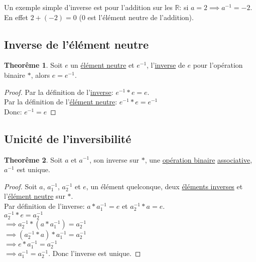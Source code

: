 \documentclass[12pt]{book}
\let\Bbb\mathbb
\def\sep{\phantom{}}
\theoremstyle{definition}
\newtheorem{theorem}{Theorême}[section]
\begin{document}
Un exemple simple d'inverse est pour l'addition sur les $\Bbb R$: si $a = 2 \implies a^{-1} = -2$. En effet $2 + (-2) = 0$ (0 est l'élément neutre de l'addition).

\subsection{Inverse de l'élément neutre}
\begin{theorem}
    \label{thm:inverse_neutre} Soit $e$ un \hyperref[def:neutre]{élément neutre} et $e^{-1}$, l'\hyperref[def:inverse]{inverse} de $e$ pour l'opération binaire $\ast$,
    alors $e = e^{-1}$.
\end{theorem}
\begin{proof}
    Par la définition de l'\hyperref[def:inverse]{inverse}: $ e^{-1} \ast e = e $. \\ \sep 
    Par la définition de l'\hyperref[def:neutre]{élément neutre}: $ e^{-1} \ast e = e^{-1} $ \\ \sep
    Donc: $e^{-1} = e$
\end{proof}

\subsection{Unicité de l'inversibilité}
\begin{theorem}
    \label{thm:inverse_unique} Soit $a$ et $a^{-1}$, son inverse sur $\ast$, une \hyperref[def:operation_binaire]{opération binaire} \hyperref[def:associativite]{associative}, $a^{-1}$ est unique.
\end{theorem}
\begin{proof}
    Soit $a$, $a_1^{-1}$, $a_2^{-1}$ et $e$, un élément quelconque, deux \hyperref[def:inverse]{éléments inverses} et l'\hyperref[def:neutre]{élément neutre} sur $\ast$. \sep \\
    Par définition de l'inverse: $a \ast a_1^{-1} = e$ et $a_2^{-1} \ast a = e$. \sep \\
    $a_2^{-1} \ast e = a_2^{-1}$ \sep \\
    $\implies a_2^{-1} \ast (a \ast a_1^{-1}) = a_2^{-1}$ \sep \\
    $\implies (a_2^{-1} \ast a) \ast a_1^{-1} = a_2^{-1}$ \sep \\
    $\implies e \ast a_1^{-1} = a_2^{-1}$ \sep \\
    $\implies a_1^{-1} = a_2^{-1}$.
    Donc l'inverse est unique.
\end{proof}
\end{document}
